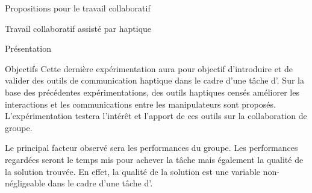 \documentclass[myfrancais]{mythesis}
\begin{document}
	\begin{mypart}{Propositions pour le travail collaboratif}
		\begin{mychapter}{Travail collaboratif assisté par haptique}
			\begin{mysection}{Présentation}
				\begin{mysubsection}{Objectifs}
					Cette dernière expérimentation aura pour objectif d'introduire et de valider des outils de communication haptique dans le cadre d'une tâche d'.
					Sur la base des précédentes expérimentations, des outils haptiques censés améliorer les interactions et les communications entre les manipulateurs sont proposés.
					L'expérimentation testera l'intérêt et l'apport de ces outils sur la collaboration de groupe.

					Le principal facteur observé sera les performances du groupe.
					Les performances regardées seront le temps mis pour achever la tâche mais également la qualité de la solution trouvée.
					En effet, la qualité de la solution est une variable non-négligeable dans le cadre d'une tâche d'.


\end{mysubsection}
\end{mysection}
\end{mychapter}
\end{mypart}
\end{document}
